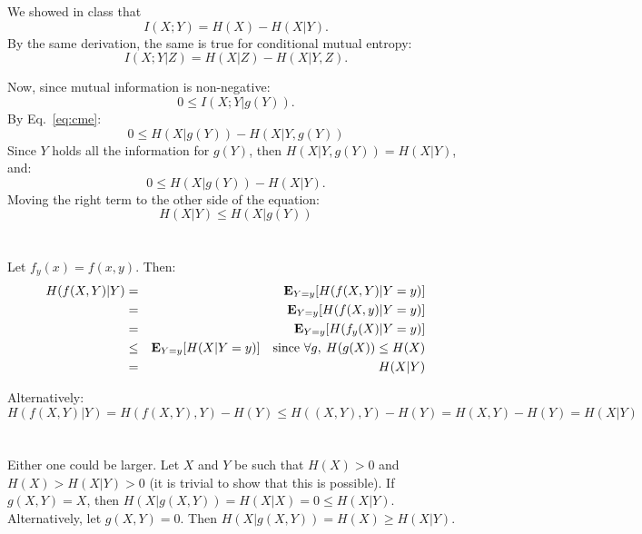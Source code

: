 \documentclass[11pt]{article} \usepackage{amssymb}
\newcommand{\E}{{\bf E}} \newcommand{\Cov}{{\bf Cov}}
\begin{document}
\section{}
We showed in class that 
\begin{equation*}
  I(X;Y)=H(X)-H(X|Y). 
\end{equation*}
By the same derivation, the same is true for conditional mutual entropy:
\begin{equation}
  \label{eq:cme}
  I(X;Y|Z)=H(X|Z)-H(X|Y,Z).
\end{equation}

Now, since mutual information is non-negative:
\begin{equation*}
  0 \leq I(X;Y|g(Y)).  
\end{equation*}
By Eq.~\ref{eq:cme}:
\begin{equation*}
  0  \leq H(X|g(Y)) - H(X|Y,g(Y))  
\end{equation*}
Since $Y$ holds all the information for $g(Y)$, then $H(X|Y,g(Y))=H(X|Y)$,
and:
\begin{equation*}
  0  \leq H(X|g(Y)) - H(X|Y).  
\end{equation*}
Moving the right term to the other side of the equation:
\begin{equation*}
   H(X|Y)  \leq H(X|g(Y))
\end{equation*}

\section{}
Let $f_y(x)=f(x,y)$. Then:
\begin{eqnarray*}
  H(f(X,Y)|Y) 
  &=& \E_{Y=y}[H(f(X,Y)|Y=y)]\\
  &=& \E_{Y=y}[H(f(X,y)|Y=y)]\\
  &=& \E_{Y=y}[H(f_y(X)|Y=y)]\\
  &\leq& \E_{Y=y}[H(X|Y=y)]\quad\mbox{since $\forall g,\:H(g(X))\leq H(X)$}\\
  &=& H(X|Y)
\end{eqnarray*}

Alternatively:
\begin{equation*}
  H(f(X,Y)|Y) = H(f(X,Y),Y) - H(Y) \leq H((X,Y),Y) - H(Y) = H(X,Y)-H(Y)=H(X|Y)
\end{equation*}

\section{}
Either one could be larger. Let $X$ and $Y$ be such that $H(X) > 0$
and $H(X) > H(X|Y) > 0$ (it is trivial to show that this is possible). 
If $g(X,Y)=X$, then $H(X|g(X,Y))=H(X|X) = 0 \leq H(X|Y)$.
Alternatively, let $g(X,Y)=0$. Then $H(X|g(X,Y))=H(X) \geq H(X|Y)$.
\end{document}
